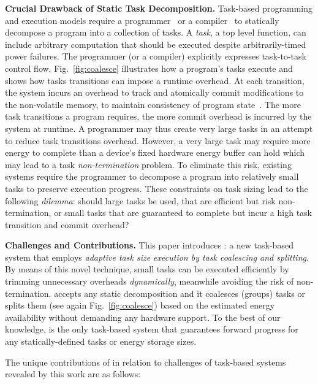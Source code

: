 \textbf{Crucial Drawback of Static Task Decomposition.} Task-based programming and execution models require a programmer~\cite{alpaca,chain} or a compiler~\cite{baghsorkhi_cgo_2018} to statically decompose a program into a collection of tasks. A \emph{task}, a top level function, can include arbitrary computation that should be executed despite arbitrarily-timed power failures. The programmer (or a compiler) explicitly expresses task-to-task control flow. Fig.~\ref{fig:coalesce} illustrates how a program's tasks execute and shows how tasks transitions can impose a runtime overhead. At each transition, the system incurs an overhead to track and atomically commit modifications to the non-volatile memory, to maintain consistency of program state~\cite{chain,alpaca}. The more task transitions a program requires, the more commit overhead is incurred by the system at runtime. A programmer may thus create very large tasks in an attempt to reduce task transitions overhead. However, a very large task may require more energy to complete than a device's fixed hardware energy buffer can hold which may lead to a task \emph{non-termination} problem. To eliminate this risk, existing systems require the programmer to decompose a program into relatively small tasks to preserve execution progress. These constraints on task sizing lead to the following \emph{dilemma}: should large tasks be used, that are efficient but risk non-termination, or small tasks that are guaranteed to complete but incur a high task transition and commit overhead?

\textbf{Challenges and Contributions.} This paper introduces \sys: a new task-based system that employs \emph{adaptive task size execution by task coalescing and splitting}. By means of this novel technique, small tasks can be executed efficiently by trimming unnecessary overheads \emph{dynamically}, meanwhile avoiding the risk of non-termination. \sys accepts any static decomposition and it coalesces (groups) tasks or splits them (see again Fig.~\ref{fig:coalesce}) based on the estimated energy availability without demanding any hardware support. To the best of our knowledge, \sys is the only task-based system that guarantees forward progress for any statically-defined tasks or energy storage sizes. 

The unique contributions of \sys in relation to challenges of task-based systems revealed by this work are as follows:

